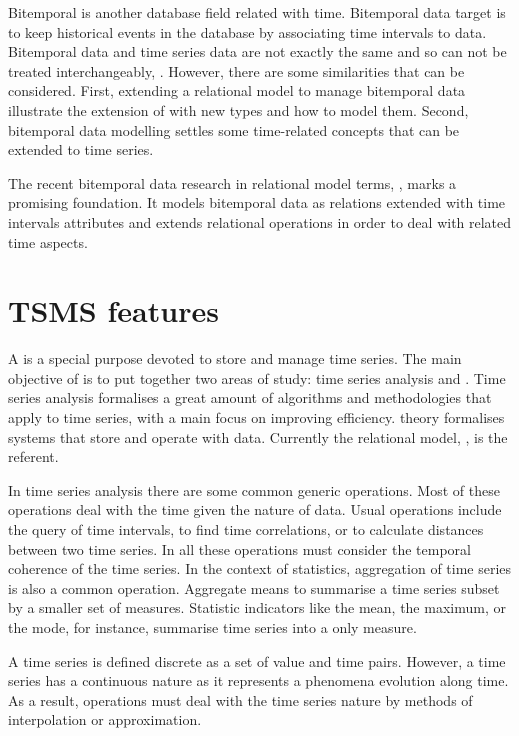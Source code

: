Bitemporal  is another database field related with
time. Bitemporal data target is to keep historical events in the
database by associating time intervals to data.  Bitemporal data and
time series data are not exactly the same and so can not be treated
interchangeably, \cite{schmidt95}. However, there are some
similarities that can be considered. First, extending a relational
model to manage bitemporal data illustrate the extension of
 with new types and how to model them. Second, bitemporal
data modelling settles some time-related concepts that can be extended
to time series.

The recent bitemporal data research in relational  model terms,
\cite{date02:_tempor_data_relat_model}, marks a promising
foundation. It models bitemporal data as relations extended with time
intervals attributes and extends relational operations in order to
deal with related time aspects.





\section{TSMS features}
\label{sec:tsms-features}

A  is a special purpose  devoted to store and
manage time series. The main objective of  is to put
together two areas of study: time series analysis and .
Time series analysis formalises a great amount of algorithms and
methodologies that apply to time series, with a main focus on
improving efficiency.  theory formalises systems that store
and operate with data. Currently the relational model,
\cite{date:introduction}, is the referent.

In time series analysis there are some common generic operations.
Most of these operations deal with the time given the nature of data.
Usual operations include the query of time intervals, to find time
correlations, or to calculate distances between two time series. In
all these operations  must consider the temporal coherence
of the time series.  In the context of statistics, aggregation of time
series is also a common operation. Aggregate means to summarise a time
series subset by a smaller set of measures. Statistic indicators like
the mean, the maximum, or the mode, for instance, summarise time
series into a only measure.


A time series is defined discrete as a set of value and time
pairs. However, a time series has a continuous nature as it represents
a phenomena evolution along time. As a result,  operations
must deal with the time series nature by methods of interpolation or
approximation.



